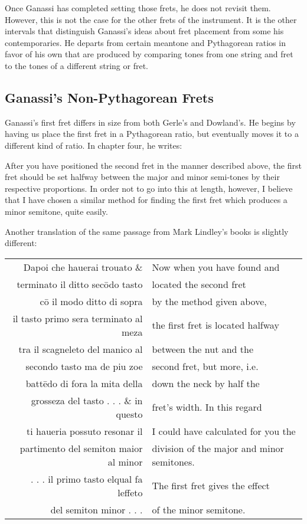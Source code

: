 Once Ganassi has completed setting those frets, he does not revisit them.  However, this is not the
case for the other frets of the instrument.  It is the other intervals that distinguish Ganassi's
ideas about fret placement from some his contemporaries. He departs from certain meantone and
Pythagorean ratios in favor of his own that are produced by comparing tones from one string and fret
to the tones of a different string or fret.

\subsection{Ganassi's Non-Pythagorean Frets}

Ganassi's first fret differs in size from both Gerle's and Dowland's.  He begins by having
us place the first fret in a Pythagorean ratio, but eventually moves it to a different
kind of ratio.  In chapter four, he writes:
\begin{blocks}
After you have positioned the second fret in the manner described above, the
first fret should be set halfway between the major and minor semi-tones by
their respective proportions.  In order not to go into this at length, however,
I believe that I have chosen a similar method for finding the first fret which
produces a minor semitone, quite easily.\autocite[106]{RB:2}
\end{blocks}
Another translation of the same passage from Mark Lindley's books is slightly different:
\begin{blocks}
\begin{center}
\begin{tabular}{r l}
Dapoi che hauerai trouato \&           & Now when you have found and \\
terminato il ditto sec\={o}do tasto    & located the second fret \\
c\={o} il modo ditto di sopra          & by the method given above, \\
il tasto primo sera terminato al meza  & the first fret is located halfway  \\
tra il scagneleto del manico al        & between the nut and the  \\
secondo tasto ma de piu zoe            & second fret, but more, i.e.  \\
batt\={e}do di fora la mita della      & down the neck by half the \\
grosseza del tasto . . . \& in questo  & fret's width.  In this regard \\
ti haueria possuto resonar il          & I could have calculated for you the \\
partimento del semiton maior al minor  & division of the major and minor semitones. \\
. . . il primo tasto elqual fa leffeto & The first fret gives the effect \\
del semiton minor . . .                & of the minor semitone. \\
\end{tabular}
\end{center}
\end{blocks}


